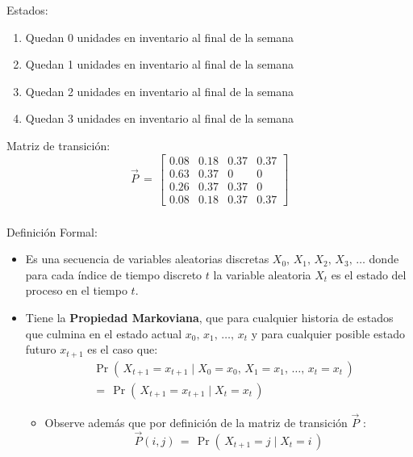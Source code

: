 \documentclass[ 10pt, xcolor = dvipsnames]{beamer}
\begin{document}
\begin{frame}[allowframebreaks]
Estados: 
\begin{enumerate}
\item Quedan 0 unidades en inventario al final de la semana
\item Quedan 1 unidades en inventario al final de la semana
\item Quedan 2 unidades en inventario al final de la semana
\item Quedan 3 unidades en inventario al final de la semana
\end{enumerate}

Matriz de transici\'on:
\[
\vec{P} \, = \, 
\left[
\begin{array}{cccc}
0.08 & 0.18 & 0.37 & 0.37 \\
0.63 & 0.37 & 0    & 0    \\
0.26 & 0.37 & 0.37 & 0    \\
0.08 & 0.18 & 0.37 & 0.37
\end{array}
\right]
\]

\framebreak

\end{frame}

\begin{frame}[allowframebreaks]
\frametitle{\insertsubsection}

Definici\'on Formal: 
\begin{itemize}
\item Es una secuencia de variables aleatorias discretas $X_0, \, X_1, \, X_2, \, X_3, \, \dots$ \linebreak donde para cada \'indice de tiempo discreto $t$ la variable aleatoria $X_t$ \linebreak es el estado del proceso en el tiempo $t$. 
\item Tiene la \textbf{Propiedad Markoviana}, \ie que para cualquier historia de estados que culmina en el estado actual $x_0, \, x_1, \, \dots, \, x_t$ y para cualquier posible \linebreak estado futuro $x_{t+1}$ es el caso que: 
\begin{align*}
& \Pr( \, X_{t+1} = x_{t+1} \mid 
X_{0} = x_{0}, \, X_{1} = x_{1}, \, \dots, \, x_{t} = x_{t} \, ) \\[1ex]
& = \, \Pr( \, X_{t+1} = x_{t+1} \mid X_{t} = x_{t} \, )
\end{align*}
\fullcut
\halfcut
\begin{itemize}
\item Observe adem\'as que por definici\'on de la matriz de transici\'on $\vec{P}$ : 
\[
\vec{P}(i,j) \, = \,
\Pr( \, X_{t+1} = j \mid X_{t} = i \, )
\]
\end{itemize}

\end{itemize}

\end{frame}
\end{document}
